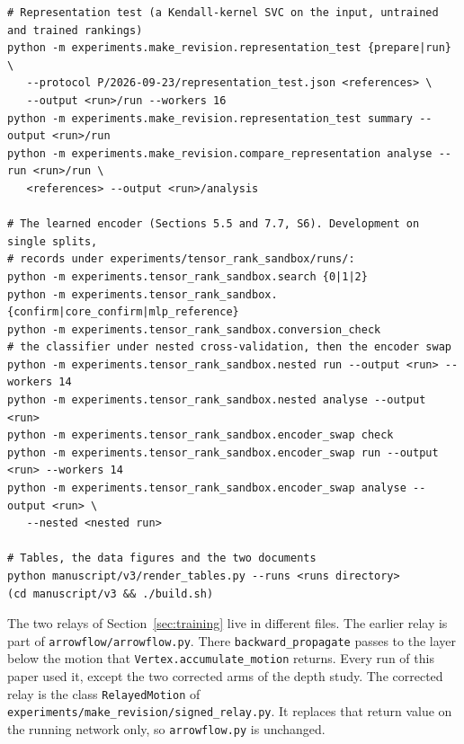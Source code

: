 \begin{scriptsize}
\begin{verbatim}
# Representation test (a Kendall-kernel SVC on the input, untrained and trained rankings)
python -m experiments.make_revision.representation_test {prepare|run} \
   --protocol P/2026-09-23/representation_test.json <references> \
   --output <run>/run --workers 16
python -m experiments.make_revision.representation_test summary --output <run>/run
python -m experiments.make_revision.compare_representation analyse --run <run>/run \
   <references> --output <run>/analysis

# The learned encoder (Sections 5.5 and 7.7, S6). Development on single splits,
# records under experiments/tensor_rank_sandbox/runs/:
python -m experiments.tensor_rank_sandbox.search {0|1|2}
python -m experiments.tensor_rank_sandbox.{confirm|core_confirm|mlp_reference}
python -m experiments.tensor_rank_sandbox.conversion_check
# the classifier under nested cross-validation, then the encoder swap
python -m experiments.tensor_rank_sandbox.nested run --output <run> --workers 14
python -m experiments.tensor_rank_sandbox.nested analyse --output <run>
python -m experiments.tensor_rank_sandbox.encoder_swap check
python -m experiments.tensor_rank_sandbox.encoder_swap run --output <run> --workers 14
python -m experiments.tensor_rank_sandbox.encoder_swap analyse --output <run> \
   --nested <nested run>

# Tables, the data figures and the two documents
python manuscript/v3/render_tables.py --runs <runs directory>
(cd manuscript/v3 && ./build.sh)
\end{verbatim}
\end{scriptsize}

The two relays of Section~\ref{sec:training} live in different files. The earlier relay is part of \texttt{arrowflow/arrowflow.py}. There \texttt{backward\_propagate} passes to the layer below the motion that \texttt{Vertex.accumulate\_motion} returns. Every run of this paper used it, except the two corrected arms of the depth study. The corrected relay is the class \texttt{RelayedMotion} of \texttt{experiments/make\_revision/signed\_relay.py}. It replaces that return value on the running network only, so \texttt{arrowflow.py} is unchanged.

